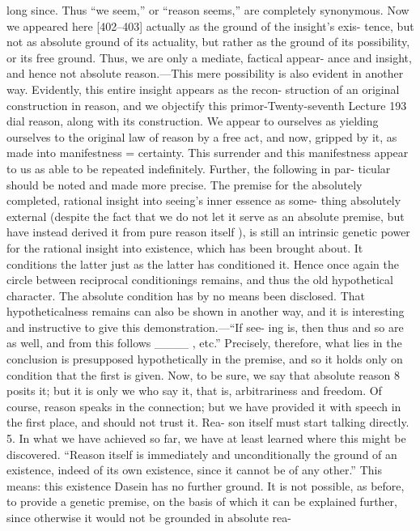 long since. Thus “we seem,” or “reason seems,” are completely synonymous.
Now we appeared here [402–403] actually as the ground of the insight’s exis-
tence, but not as absolute ground of its actuality, but rather as the ground of
its possibility, or its free ground. Thus, we are only a mediate, factical appear-
ance and insight, and hence not absolute reason.—This mere possibility is
also evident in another way. Evidently, this entire insight appears as the recon-
struction of an original construction in reason, and we objectify this primor-Twenty-seventh Lecture
193
dial reason, along with its construction. We appear to ourselves as yielding
ourselves to the original law of reason by a free act, and now, gripped by it,
as made into manifestness = certainty. This surrender and this manifestness
appear to us as able to be repeated indefinitely. Further, the following in par-
ticular should be noted and made more precise. The premise for the
absolutely completed, rational insight into seeing’s inner essence as some-
thing absolutely external (despite the fact that we do not let it serve as an
absolute premise, but have instead derived it from pure reason itself ), is still
an intrinsic genetic power for the rational insight into existence, which has
been brought about. It conditions the latter just as the latter has conditioned
it. Hence once again the circle between reciprocal conditionings remains, and
thus the old hypothetical character. The absolute condition has by no means
been disclosed. That hypotheticalness remains can also be shown in another
way, and it is interesting and instructive to give this demonstration.—“If see-
ing is, then thus and so are as well, and from this follows ____ , etc.” Precisely,
therefore, what lies in the conclusion is presupposed hypothetically in the
premise, and so it holds only on condition that the first is given. Now, to be
sure, we say that absolute reason 8 posits it; but it is only we who say it, that is,
arbitrariness and freedom. Of course, reason speaks in the connection; but we
have provided it with speech in the first place, and should not trust it. Rea-
son itself must start talking directly.
5. In what we have achieved so far, we have at least learned where this
might be discovered. “Reason itself is immediately and unconditionally the
ground of an existence, indeed of its own existence, since it cannot be of any
other.” This means: this existence {Dasein} has no further ground. It is not
possible, as before, to provide a genetic premise, on the basis of which it can
be explained further, since otherwise it would not be grounded in absolute rea-
